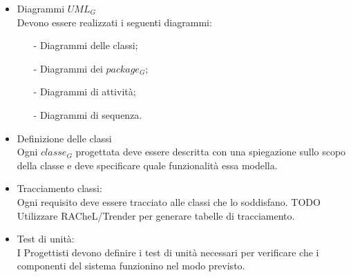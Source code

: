 				\begin{itemize}
					\item Diagrammi $UML_G$\\
					Devono essere realizzati i seguenti diagrammi:
					\begin{itemize}
						\item[-] Diagrammi delle classi;
						\item[-] Diagrammi dei $package_G$;
						\item[-] Diagrammi di attività;
						\item[-] Diagrammi di sequenza.
					\end{itemize}
					\item Definizione delle classi\\ 
					Ogni $classe_G$ progettata deve essere descritta con una spiegazione sullo scopo della classe e deve specificare quale funzionalità essa modella. 
					\item Tracciamento classi:\\
					Ogni requisito deve essere tracciato alle classi che lo soddisfano. TODO Utilizzare RACheL/Trender  per generare tabelle di tracciamento.
					\item Test di unità:\\
					I Progettisti devono definire i test di unità necessari per verificare che i componenti del sistema funzionino nel modo previsto.
				\end{itemize}
			
			
